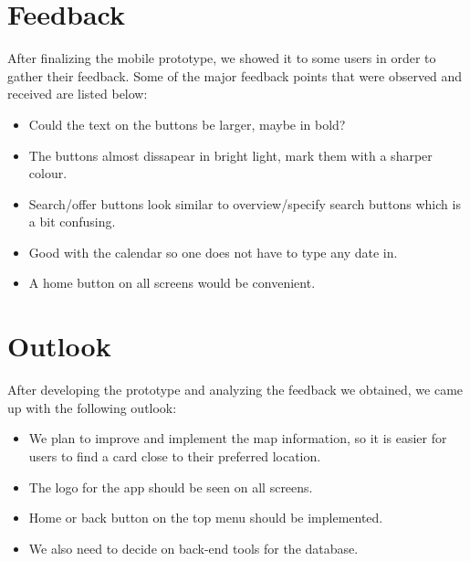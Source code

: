 \documentclass[11pt,twoside,a4paper]{report}
\begin{document}
\section{Feedback}

After finalizing the mobile prototype, we showed it to some users in order to gather their feedback. Some of the major feedback points that were observed and received are listed below:

\begin{itemize}

\item Could the text on the buttons be larger, maybe in bold?

\item The buttons almost dissapear in bright light, mark them with a sharper colour.

\item Search/offer buttons look similar to overview/specify search buttons which is a bit confusing.

\item Good with the calendar so one does not have to type any date in.

\item A home button on all screens would be convenient.

\end{itemize}

\section{Outlook}

After developing the prototype and analyzing the feedback we obtained, we came up with the following outlook:

\begin{itemize}

\item We plan to improve and implement the map information, so it is easier for users to find a card close to their preferred location.

\item The logo for the app should be seen on all screens.

\item Home or back button on the top menu should be implemented.

\item We also need to decide on back-end tools for the database.

\end{itemize}
\end{document}
